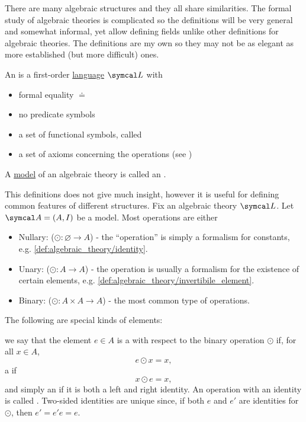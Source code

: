 \begin{definition}\label{def:algebraic_theory}\cite[remark 2.1.4]{Leinster2014}
  There are many algebraic structures and they all share similarities. The formal study of algebraic theories is complicated so the definitions will be very general and somewhat informal, yet allow defining fields unlike other definitions for algebraic theories. The definitions are my own so they may not be as elegant as more established (but more difficult) ones.

  An  is a first-order \hyperref[def:first_order_logic_language]{language} \( \Cal{L} \) with
  \begin{itemize}
    \item formal equality \( \doteq \)
    \item no predicate symbols
    \item a set of functional symbols, called 
    \item a set of axioms concerning the operations (see )
  \end{itemize}

  A \hyperref[def:first_order_model]{model} of an algebraic theory is called an .

  This definitions does not give much insight, however it is useful for defining common features of different structures. Fix an algebraic theory \( \Cal{L} \). Let \( \Cal{A} = (A, I) \) be a model. Most operations are either
  \begin{itemize}
    \item Nullary: (\( \odot: \varnothing \to A \)) - the \enquote{operation} is simply a formalism for constants, e.g. \ref{def:algebraic_theory/identity}.
    \item Unary: (\( \odot: A \to A \)) - the operation is usually a formalism for the existence of certain elements, e.g. \ref{def:algebraic_theory/invertibile_element}.
    \item Binary: (\( \odot: A \times A \to A \)) - the most common type of operations.
  \end{itemize}

  The following are special kinds of elements:
  \begin{defenum}
     we say that the element \( e \in A \) is a  with respect to the binary operation \( \odot \) if, for all \( x \in A \),
    \begin{equation*}
      e \odot x = x,
    \end{equation*}
    a  if
    \begin{equation*}
      x \odot e = x,
    \end{equation*}
    and simply an  if it is both a left and right identity. An operation with an identity is called . Two-sided identities are unique since, if both \( e \) and \( e' \) are identities for \( \odot \), then \( e' = e' e = e \).


\end{defenum}
\end{definition}
